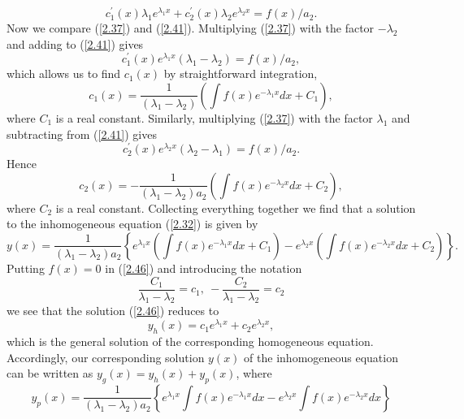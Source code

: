 \documentclass[11pt,a4paper]{article}
\begin{document}
	\begin{equation}\label{2.41}
		c_1^\prime(x)\lambda_1e^{\lambda_1x} + c_2^\prime(x)\lambda_2e^{\lambda_2x} = f(x)/a_2.
	\end{equation}
	Now we compare (\ref{2.37}) and (\ref{2.41}). Multiplying (\ref{2.37}) with the factor $−\lambda_2$ and adding to (\ref{2.41}) gives
	\begin{equation}\label{2.42}
		c_1^\prime(x)e^{\lambda_1x}(\lambda_1-\lambda_2) = f(x)/a_2,
	\end{equation}
	which allows us to find $c_1(x)$ by straightforward integration,
	\begin{equation}\label{2.43}
		c_1(x) = \frac{1}{(\lambda_1-\lambda_2)}\left(\int f(x)e^{-\lambda_1x}dx+C_1\right),
	\end{equation}
	where $C_1$ is a real constant. Similarly, multiplying (\ref{2.37}) with the factor $\lambda_1$ and subtracting from (\ref{2.41}) gives
	\begin{equation}\label{2.44}
		c_2^\prime(x)e^{\lambda_2x}(\lambda_2-\lambda_1) = f(x)/a_2.
	\end{equation}
	Hence
	\begin{equation}\label{2.45}
		c_2(x) = -\frac{1}{(\lambda_1-\lambda_2)a_2}\left(\int f(x)e^{-\lambda_2x}dx+C_2\right),
	\end{equation}
	where $C_2$ is a real constant. Collecting everything together we find that a solution to the inhomogeneous equation (\ref{2.32}) is given by
	\begin{equation}\label{2.46}
		y(x) = \frac{1}{(\lambda_1-\lambda_2)a_2}\left\{e^{\lambda_1x}\left(\int f(x)e^{-\lambda_1x}dx+C_1\right)-e^{\lambda_2x}\left(\int f(x)e^{-\lambda_2x}dx+C_2\right)\right\}.
	\end{equation}
	Putting $f(x) = 0$ in (\ref{2.46}) and introducing the notation
	$$
	\frac{C_1}{\lambda_1-\lambda_2} = c_1,\ -\frac{C_2}{\lambda_1-\lambda_2}=c_2
	$$
	we see that the solution (\ref{2.46}) reduces to
	\begin{equation}\label{2.47}
		y_h(x) = c_1e^{\lambda_1x} + c_2e^{\lambda_2x},
	\end{equation}
	which is the general solution of the corresponding homogeneous equation. Accordingly, our corresponding solution $y(x)$ of the inhomogeneous equation can be written as $y_g(x) = y_h(x) + y_p(x)$, where
	\begin{equation}\label{2.48}
		y_p(x) = \frac{1}{(\lambda_1-\lambda_2)a_2}\left\{e^{\lambda_1x}\int f(x)e^{-\lambda_1x}dx - e^{\lambda_2x}\int f(x)e^{-\lambda_2x}dx\right\}
	\end{equation}
\end{document}
